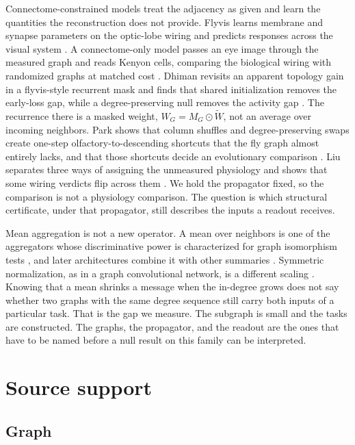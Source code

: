 \documentclass[10pt,twocolumn,letterpaper]{article}
\begin{document}
Connectome-constrained models treat the adjacency as given and learn the quantities the reconstruction does not provide.
Flyvis learns membrane and synapse parameters on the optic-lobe wiring and predicts responses across the visual system \cite{lappalainen2024}.
A connectome-only model passes an eye image through the measured graph and reads Kenyon cells, comparing the biological wiring with randomized graphs at matched cost \cite{correig2026}.
Dhiman revisits an apparent topology gain in a flyvis-style recurrent mask and finds that shared initialization removes the early-loss gap, while a degree-preserving null removes the activity gap \cite{dhiman2026}.
The recurrence there is a masked weight, $W_G = M_G \odot \widetilde W$, not an average over incoming neighbors.
Park shows that column shuffles and degree-preserving swaps create one-step olfactory-to-descending shortcuts that the fly graph almost entirely lacks, and that those shortcuts decide an evolutionary comparison \cite{park2026}.
Liu separates three ways of assigning the unmeasured physiology and shows that some wiring verdicts flip across them \cite{liu2026}.
We hold the propagator fixed, so the comparison is not a physiology comparison.
The question is which structural certificate, under that propagator, still describes the inputs a readout receives.

Mean aggregation is not a new operator.
A mean over neighbors is one of the aggregators whose discriminative power is characterized for graph isomorphism tests \cite{xu2019gin}, and later architectures combine it with other summaries \cite{corso2020pna,hamilton2017graphsage}.
Symmetric normalization, as in a graph convolutional network, is a different scaling \cite{kipf2017gcn}.
Knowing that a mean shrinks a message when the in-degree grows does not say whether two graphs with the same degree sequence still carry both inputs of a particular task.
That is the gap we measure.
The subgraph is small and the tasks are constructed.
The graphs, the propagator, and the readout are the ones that have to be named before a null result on this family can be interpreted.

\section{Source support}
\label{sec:method}

\subsection{Graph}
\label{sec:graph}
\end{document}
